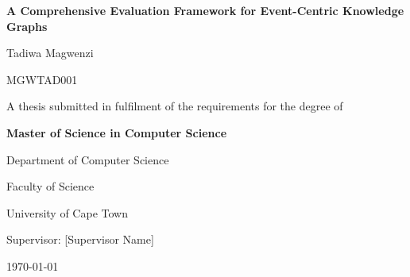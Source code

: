 \documentclass[12pt,a4paper]{report}
\begin{document}
\begin{titlepage}
    \centering
    \vspace*{2cm}
    
    {\LARGE\bfseries A Comprehensive Evaluation Framework for Event-Centric Knowledge Graphs\par}
    
    \vspace{2cm}
    
    {\Large Tadiwa Magwenzi\par}
    {\large MGWTAD001\par}
    
    \vspace{2cm}
    
    {\large A thesis submitted in fulfilment of the requirements for the degree of\par}
    {\large\bfseries Master of Science in Computer Science\par}
    
    \vspace{1.5cm}
    
    {\large Department of Computer Science\par}
    {\large Faculty of Science\par}
    {\large University of Cape Town\par}
    
    \vspace{1.5cm}
    
    {\large Supervisor: [Supervisor Name]\par}
    
    \vfill
    
    {\large \today\par}
\end{titlepage}


\clearpage


\clearpage


\clearpage

\tableofcontents
\clearpage

\listoffigures
\clearpage

\listoftables
\clearpage


\clearpage

\end{document}
